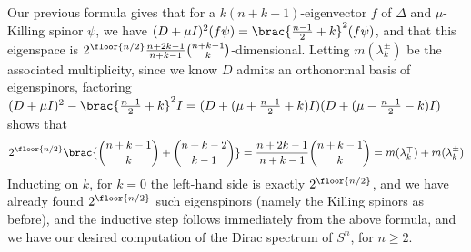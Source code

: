 \documentclass[11pt]{article}
\begin{document}
Our previous formula gives that for a $k(n + k - 1)$-eigenvector $f$ of $\Delta$ and $\mu$-Killing spinor $\psi$, we have $(D + \mu I)^2(f\psi) = \brac{\frac{n - 1}{2} + k}^2(f\psi)$, and that this eigenspace is $2^{\floor{n/2}}\frac{n + 2k - 1}{n + k - 1}{n + k - 1 \choose k}$-dimensional. Letting $m(\lambda_k^\pm)$ be the associated multiplicity, since we know $D$ admits an orthonormal basis of eigenspinors, factoring $(D + \mu I)^2 - \brac{\frac{n - 1}{2} + k}^2I = (D + (\mu + \frac{n - 1}{2} + k)I)(D + (\mu - \frac{n - 1}{2} - k)I)$ shows that 
$$
    2^{\floor{n/2}}\brac{{n + k - 1 \choose k} + {n + k - 2 \choose k - 1}} = \frac{n + 2k - 1}{n + k - 1}{n + k - 1 \choose k} = m(\lambda_k^\mp) + m(\lambda_k^\pm)
$$
Inducting on $k$, for $k = 0$ the left-hand side is exactly $2^{\floor{n/2}}$, and we have already found $2^{\floor{n/2}}$ such eigenspinors (namely the Killing spinors as before), and the inductive step follows immediately from the above formula, and we have our desired computation of the Dirac spectrum of $S^n$, for $n \geq 2$.


\end{document}
